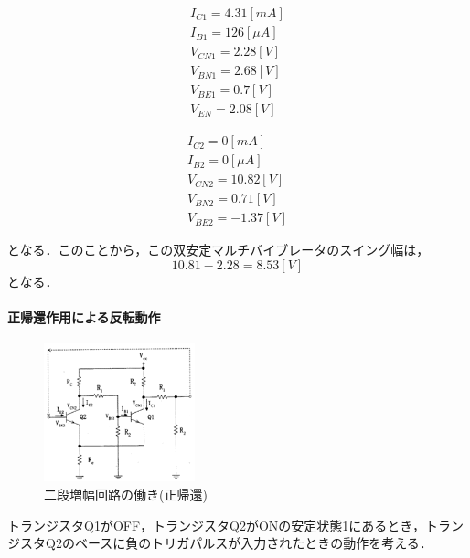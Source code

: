 \documentclass[10pt, a4j, dvipdfmx]{jarticle}
\begin{document}
    \begin{minipage}{0.5\hsize}
        \begin{eqnarray}
            I_{C1} = 4.31 [mA] \nonumber \\
            I_{B1} = 126 [\mu A] \nonumber \\
            V_{CN1} = 2.28 [V] \nonumber \\
            V_{BN1} = 2.68 [V] \nonumber \\
            V_{BE1} = 0.7 [V] \nonumber \\
            V_{EN} = 2.08 [V] \nonumber
        \end{eqnarray}
    \end{minipage}
    \begin{minipage}{0.5\hsize}
        \begin{eqnarray}
            I_{C2} = 0 [mA] \nonumber \\
            I_{B2} = 0 [\mu A] \nonumber \\
            V_{CN2} = 10.82 [V] \nonumber \\
            V_{BN2} = 0.71 [V] \nonumber \\
            V_{BE2} = -1.37 [V] \nonumber
        \end{eqnarray}
    \end{minipage}

    となる．このことから，この双安定マルチバイブレータのスイング幅は，
    \[
        10.81 - 2.28 = 8.53 [V]
    \]
    となる．

    \paragraph{正帰還作用による反転動作}
    \begin{figure}
        \vspace*{-\intextsep}
        \begin{center}
        \includegraphics[height=40mm]{images/fig-5.png}
        \caption{二段増幅回路の働き(正帰還)}
        \label{fig:5}
        \end{center}
    \end{figure}
    トランジスタQ1がOFF，トランジスタQ2がONの安定状態1にあるとき，トランジスタQ2のベースに負のトリガパルスが入力されたときの動作を考える．
\end{document}
